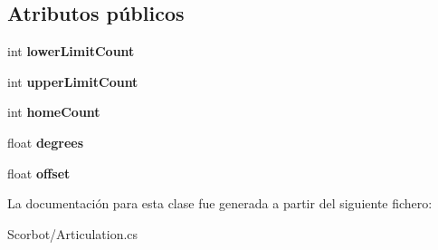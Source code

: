 \subsection*{Atributos públicos}
\begin{DoxyCompactItemize}
\item 
\mbox{\label{class_articulation_ab6f41ba4973672807b535fac03c03a18}} 
int {\bfseries lower\+Limit\+Count}
\item 
\mbox{\label{class_articulation_a0ce352a643712286ef497bbea705ca4d}} 
int {\bfseries upper\+Limit\+Count}
\item 
\mbox{\label{class_articulation_aa91625a05579d28909f96473cbd02744}} 
int {\bfseries home\+Count}
\item 
\mbox{\label{class_articulation_ae611787f027dbde080c7530fa68d1eee}} 
float {\bfseries degrees}
\item 
\mbox{\label{class_articulation_a14c25a5ae970e12d63af0224be518556}} 
float {\bfseries offset}
\end{DoxyCompactItemize}


La documentación para esta clase fue generada a partir del siguiente fichero\+:\begin{DoxyCompactItemize}
\item 
Scorbot/Articulation.\+cs\end{DoxyCompactItemize}
